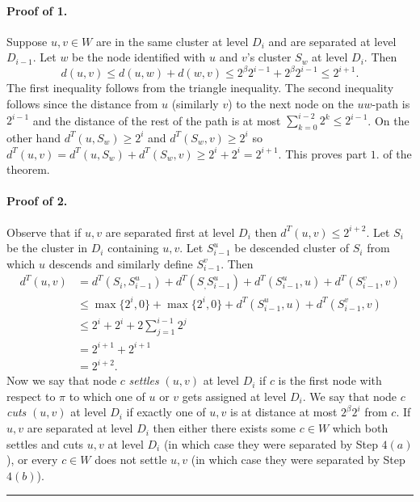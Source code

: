 \documentclass[letterpaper,12pt,oneside,onecolumn]{article}
\newenvironment{proof}{{\bf Proof:  }}{\hfill\rule{2mm}{2mm}}
\begin{document}
\begin{proof}
\paragraph{Proof of 1.}
Suppose $u,v \in W$ are in the same cluster at level $D_i$ and are separated at level $D_{i-1}$. Let $w$ be the node identified with $u$ and $v$'s cluster $S_w$ at level $D_i$. Then
$$d(u,v) \leq d(u,w) + d(w,v) \leq 2^\beta 2^{i-1} + 2^\beta 2^{i-1} \leq 2^{i+1}.$$ The first inequality follows from the triangle inequality. The second inequality follows since the distance from $u$ (similarly $v$) to the next node on the $uw$-path is $2^{i-1}$ and the distance of the rest of the path is at most $\sum_{k=0}^{i-2} 2^k \leq 2^{i-1}$. On the other hand $d^T(u, S_w) \geq 2^i$ and $d^T(S_w, v) \geq 2^i$ so $d^T(u,v) = d^T(u, S_w) + d^T(S_w, v) \geq 2^i + 2^i = 2^{i+1}$. This proves part $1.$ of the theorem.
\paragraph{Proof of 2.}
Observe that if $u,v$ are separated first at level $D_i$ then $d^T(u,v) \leq 2^{i+2}$. Let $S_i$ be the cluster in $D_i$ containing $u,v$. Let $S^u_{i-1}$ be descended cluster of $S_i$ from which $u$ descends and similarly define $S^v_{i-1}$. Then 
\begin{align*}
d^T(u,v) &= d^T(S_i, S^u_{i-1}) + d^T(S_, S^u_{i-1}) + d^T(S^u_{i-1}, u) + d^T(S^v_{i-1}, v)\\
&\leq \max\{2^i,0\} + \max\{2^i,0\} +  d^T(S^u_{i-1}, u) + d^T(S^v_{i-1}, v) \\
&\leq 2^i + 2^i + 2\sum_{j = 1}^{i-1} 2^j \\
&= 2^{i+1} + 2^{i+1} \\
&= 2^{i+2}.
\end{align*}
Now we say that node $c$ {\it settles} $(u,v)$ at level $D_i$ if $c$ is the first node with respect to $\pi$ to which one of $u$ or $v$ gets assigned at level $D_i$. We say that node $c$ {\it cuts} $(u,v)$ at level $D_i$ if exactly one of $u,v$ is at distance at most $2^\beta 2^i$ from $c$. If $u,v$ are separated at level $D_i$ then either there exists some $c \in W$ which both settles and cuts $u,v$ at level $D_i$ (in which case they were separated by Step $4(a)$), or every $c \in W$ does not settle $u,v$ (in which case they were separated by Step $4(b)$).

\end{proof}
\end{document}
